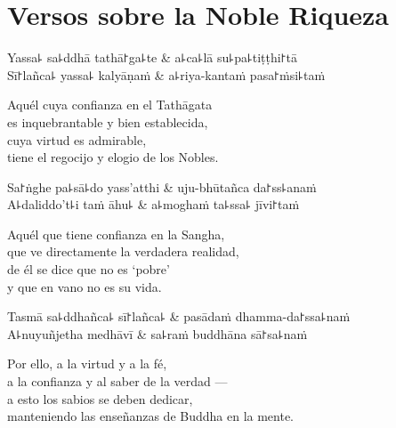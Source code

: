 \chapter{Versos sobre la Noble Riqueza}


\begin{leader}
\end{leader}

\begin{twochants}
  Yassa꜕ sa꜕ddhā tathā꜓ga꜕te & a꜕ca꜕lā su꜕pa꜕tiṭṭhi꜓tā \\
  Sī꜓lañca꜕ yassa꜕ kalyāṇaṁ & a꜕riya-kantaṁ pasa꜓ṁsi꜕taṁ \\
\end{twochants}

\begin{english}
  Aquél cuya confianza en el Tathāgata\\
  es inquebrantable y bien establecida,\\
  cuya virtud es admirable,\\
  tiene el regocijo y elogio de los Nobles.
\end{english}

\begin{twochants}
  Sa꜓ṅghe pa꜕sā꜕do yass'atthi & uju-bhūtañca da꜓ss꜕anaṁ \\
  A꜕daliddo't꜕i taṁ āhu꜕ & a꜕moghaṁ ta꜕ssa꜕ jīvi꜓taṁ \\
\end{twochants}

\begin{english}
  Aquél que tiene confianza en la Sangha,\\
  que ve directamente la verdadera realidad,\\
  de él se dice que no es `pobre'\\
  y que en vano no es su vida.
\end{english}

\begin{twochants}
  Tasmā sa꜕ddhañca꜕ sī꜓lañca꜕ & pasādaṁ dhamma-da꜓ssa꜕naṁ \\
  A꜕nuyuñjetha medhāvī & sa꜕raṁ buddhāna sā꜓sa꜕naṁ \\
\end{twochants}

\begin{english}
  Por ello, a la virtud y a la fé,\\
  a la confianza y al saber de la verdad ---\\
  a esto los sabios se deben dedicar,\\
  manteniendo las enseñanzas de Buddha en la mente.
\end{english}

